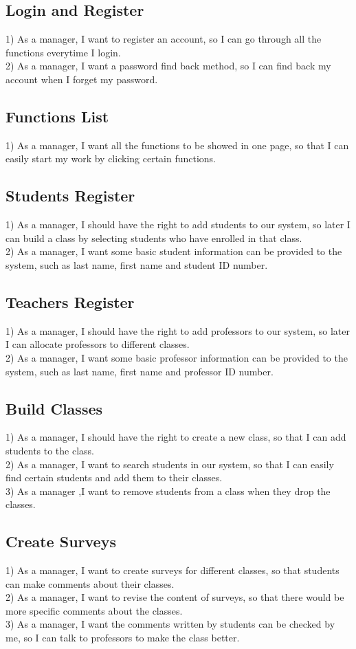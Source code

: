 \subsection{Login and Register}
1) As a manager, I want to register an account, so I can go through all the functions everytime I login.\\2) As a manager, I want a password find back method, so I can find back my account when I forget my password.

\subsection{Functions List}
1) As a manager, I want all the functions to be showed in one page, so that I can easily start my work by clicking certain functions.

\subsection{Students Register}
1) As a manager, I should have the right to add students to our system, so later I can build a class by selecting students who have enrolled in that class.\\
2) As a manager, I want some basic student information can be provided to the system, such as last name, first name and student ID number.

\subsection{Teachers Register}
1) As a manager, I should have the right to add professors to our system, so later I can allocate professors to different classes.\\
2) As a manager, I want some basic professor information can be provided to the system, such as last name, first name and professor ID number.

\subsection{Build Classes}
1) As a manager, I should have the right to create a new class, so that I can add students to the class.\\
2) As a manager, I want to search students in our system, so that I can easily find certain students and add them to their classes.\\
3) As a manager ,I want to remove students from a class when they drop the classes.

\subsection{Create Surveys}
1) As a manager, I want to create surveys for different classes, so that students can make comments about their classes.\\
2) As a manager, I want to revise the content of surveys, so that there would be more specific comments about the classes.\\
3) As a manager, I want the comments written by students can be checked by me, so I can talk to professors to make the class better.